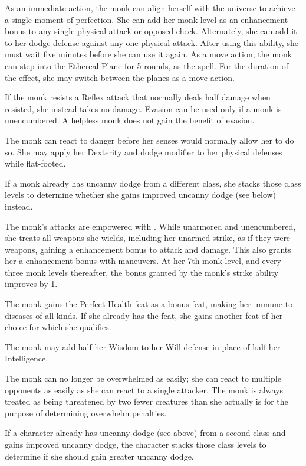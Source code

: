  As an immediate action, the monk can align herself with the universe to achieve a single moment of perfection. She can add her monk level as an enhancement bonus to any single physical attack or opposed check. Alternately, she can add it to her dodge defense against any one physical attack. After using this ability, she must wait five minutes before she can use it again.
 As a move action, the monk can step into the Ethereal Plane for 5 rounds, as the  spell. For the duration of the effect, she may switch between the planes as a move action.

 If the monk resists a Reflex attack that normally deals half damage when resisted, she instead takes no damage. Evasion can be used only if a monk is unencumbered. A helpless monk does not gain the benefit of evasion.

 The monk can react to danger before her senses would normally allow her to do so. She may apply her Dexterity and dodge modifier to her physical defenses while flat-footed.

If a monk already has uncanny dodge from a different class, she stacks those class levels to determine whether she gains improved uncanny dodge (see below) instead.

 The monk's attacks are empowered with \ki. While unarmored and unencumbered, she treats all weapons she wields, including her unarmed strike, as if they were  weapons, gaining a  enhancement bonus to attack and damage. This also grants her a  enhancement bonus with maneuvers. At her 7th monk level, and every three monk levels thereafter, the bonus granted by the monk's \ki strike ability improves by 1. 

 The monk gains the Perfect Health feat as a bonus feat, making her immune to diseases of all kinds. If she already has the feat, she gains another feat of her choice for which she qualifies.

 The monk may add half her Wisdom to her Will defense in place of half her Intelligence.

 The monk can no longer be overwhelmed as easily; she can react to multiple opponents as easily as she can react to a single attacker. The monk is always treated as being threatened by two fewer creatures than she actually is for the purpose of determining overwhelm penalties.
\par If a character already has uncanny dodge (see above) from a second class and gains improved uncanny dodge, the character stacks those class levels to determine if she should gain greater uncanny dodge.

